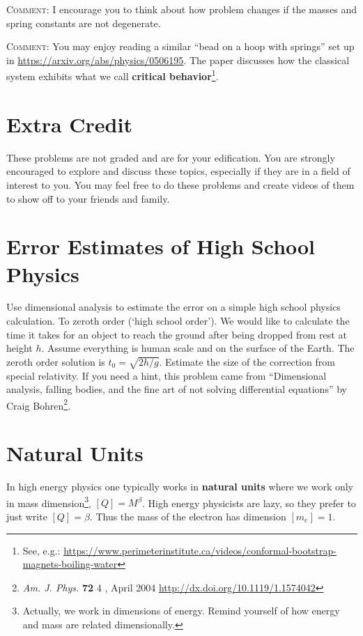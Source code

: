 \documentclass[12pt]{article}
\numberwithin{equation}{section}    %
\begin{document}
\textsc{Comment}: I encourage you to think about how problem changes if the masses and spring constants are not degenerate. 

\textsc{Comment}: You may enjoy reading a similar ``bead on a hoop with springs'' set up in \url{https://arxiv.org/abs/physics/0506195}. The paper discusses how the classical system exhibits what we call \textbf{critical behavior}\footnote{See, e.g.: \url{https://www.perimeterinstitute.ca/videos/conformal-bootstrap-magnets-boiling-water}}.



\appendix
\section*{Extra Credit}

These problems are not graded and are for your edification. You are strongly encouraged to explore and discuss these topics, especially if they are in a field of interest to you. You may feel free to do these problems and create videos of them to show off to your friends and family. 

\section{Error Estimates of High School Physics}

Use dimensional analysis to estimate the error on a simple high school physics calculation. To zeroth order (`high school order'). We would like to calculate the time it takes for an object to reach the ground after being dropped from rest at height $h$. Assume everything is human scale and on the surface of the Earth. The zeroth order solution is $t_0 = \sqrt{2h/g}$. Estimate the size of the correction from special relativity. If you need a hint, this problem came from ``Dimensional analysis, falling bodies, and the fine art of not solving differential equations'' by Craig Bohren\footnote{\emph{Am. J. Phys.} \textbf{72}  4 , April 2004 \url{http://dx.doi.org/10.1119/1.1574042}}. 

\section{Natural Units}

In high energy physics one typically works in \textbf{natural units} where we work only in mass dimension\footnote{Actually, we work in dimensions of energy. Remind yourself of how energy and mass are related dimensionally.}, $[Q] = M^\beta$. High energy physicists are lazy, so they prefer to just write $[Q]=\beta$. Thus the mass of the electron has dimension $[m_e] = 1$. 
\end{document}
